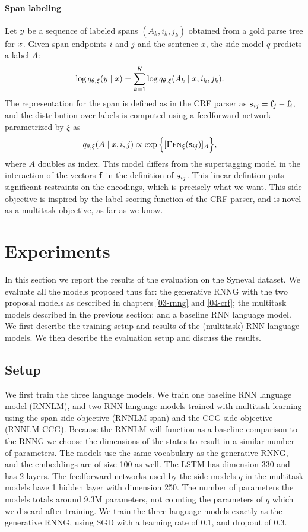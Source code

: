     \paragraph{Span labeling}
      Let $y$ be a sequence of labeled spans $(A_k, i_k, j_k)$ obtained from a gold parse tree for $x$. Given span endpoints $i$ and $j$ and the sentence $x$, the side model $q$ predicts a label $A$:
      \begin{align*}
        \log q_{\theta, \xi}(y \mid x)
          &= \sum_{k=1}^K \log q_{\theta, \xi}( A_k \mid x, i_k, j_k).
      \end{align*}
      The representation for the span is defined as in the CRF parser as $\mathbf{s}_{ij} = \mathbf{f}_j - \mathbf{f}_i$, and the distribution over labels is computed using a feedforward network parametrized by $\xi$ as
      \begin{align*}
        q_{\theta, \xi}( A \mid x, i, j) &\propto \exp \Big \{ [ \textsc{Ffn}_{\xi}( \mathbf{s}_{ij} ) ]_{A} \Big\},
      \end{align*}
      where $A$ doubles as index. This model differs from the supertagging model in the interaction of the vectors $\mathbf{f}$ in the definition of $\mathbf{s}_{ij}$. This linear defintion puts significant restraints on the encodings, which is precisely what we want. This side objective is inspired by the label scoring function of the CRF parser, and is novel as a multitask objective, as far as we know.

\section{Experiments}
  In this section we report the results of the evaluation on the Syneval dataset. We evaluate all the models proposed thus far: the generative RNNG with the two proposal models as described in chapters \ref{03-rnng} and \ref{04-crf}; the multitask models described in the previous section; and a baseline RNN language model. We first describe the training setup and results of the (multitask) RNN language models. We then describe the evaluation setup and discuss the results.

  \subsection{Setup}
    We first train the three language models. We train one baseline RNN language model (RNNLM), and two RNN language models trained with multitask learning using the span side objective (RNNLM-span) and the CCG side objective (RNNLM-CCG). Because the RNNLM will function as a baseline comparison to the RNNG we choose the dimensions of the states to result in a similar number of parameters. The models use the same vocabulary as the generative RNNG, and the embeddings are of size 100 as well. The LSTM has dimension 330 and has 2 layers. The feedforward networks used by the side models $q$ in the multitask models have 1 hidden layer with dimension 250. The number of parameters the models totals around 9.3M parameters, not counting the parameters of $q$ which we discard after training. We train the three language models exactly as the generative RNNG, using SGD with a learning rate of 0.1, and dropout of 0.3.

